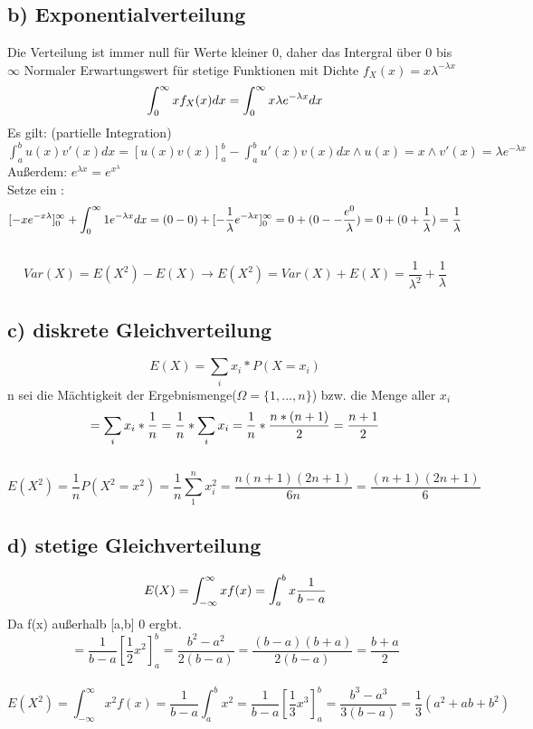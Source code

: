 \documentclass[11pt]{article} %
\begin{document}
\subsection*{b) Exponentialverteilung}
Die Verteilung ist immer null für Werte kleiner 0, daher das Intergral über 0 bis $\infty$
Normaler Erwartungswert für stetige Funktionen mit Dichte $f_X(x) =x \lambda ^{-\lambda x}  $
$$ 
\int_{0}^{\infty}  x f_X(x) dx \\
= \int_{0}^{\infty} x \lambda  e^{-\lambda x} dx \\
$$
Es gilt: (partielle Integration)\\
$\int_a^b u(x)v'(x) dx = [ u(x) v(x) ]_a^b - \int_a^b u' (x) v(x) dx  \land u(x) = x \land v'(x) = \lambda e^{-\lambda x} $\\
Außerdem: $e^{\lambda x} = e ^ {x ^ \lambda} $\\
Setze ein :
$$
[-x  e^{-x \lambda} ]_0^\infty + \int_{0}^{\infty} 1 e^{-\lambda x} dx \\
=(0 - 0) + [ - \frac{1}{\lambda} e^{-\lambda x} ]_0^\infty \\
= 0 + ( 0 -  -\frac{e^0}{\lambda}  )
= 0 + ( 0 + \frac{1}{\lambda}) \\
= \frac{1}{\lambda}
$$\\
\noindent\makebox[\linewidth]{\rule{\textwidth}{0.4pt}}
$$Var(X) = E(X^2) -E(X) \rightarrow E(X^2) = Var(X) +E(X)  = \frac{1}{\lambda^2} + \frac{1}{\lambda}  $$


\subsection*{c) diskrete  Gleichverteilung}
$$
E(X) = \sum_i x_i * P(X=x_i) 
$$
n sei die Mächtigkeit der Ergebnismenge($\Omega = \{1, ... , n\} $) bzw. die Menge aller $x_i$
$$
=\sum_i x_i * \frac{1}{n} \\
= \frac{1}{n} * \sum_i x_i  \\
= \frac{1}{n} * \frac{n * (n+1)}{2} \\
=\frac{n+1}{2}
$$ \\
\noindent\makebox[\linewidth]{\rule{\textwidth}{0.4pt}}
$$ E(X^2) = \frac{1}{n} P(X^2 =x^2 ) = \frac{1}{n} \sum_1^n x_i^2 = 
\frac{n (n+1) (2n+1)}{6n} = \frac{(n+1)(2n+1)}{6}
$$

\subsection{d) stetige Gleichverteilung}
$$
E(X) = \int_{-\infty}^\infty x f(x) = \int_a^b x \frac{1}{b-a}\\$$
Da f(x) außerhalb [a,b] 0 ergbt.
$$
=\frac{1}{b-a} [\frac{1}{2} x^2]_a^b = \frac{b^2-a^2}{2 (b-a)} = \frac{(b-a) (b+a)}{2(b-a)} = \frac{b+a}{2}
$$
\noindent\makebox[\linewidth]{\rule{\textwidth}{0.4pt}}
\\$$E(X^2)=\int_{-\infty}^\infty x^2 f(x) = \frac{1}{b-a} \int_{a}^{b}x^2 = \frac{1}{b-a} [\frac{1}{3} x^3]^b_a = \frac{b^3 - a^3}{3(b-a)} = \frac{1}{3}(a^2 + ab + b^2) 
$$
\end{document}
